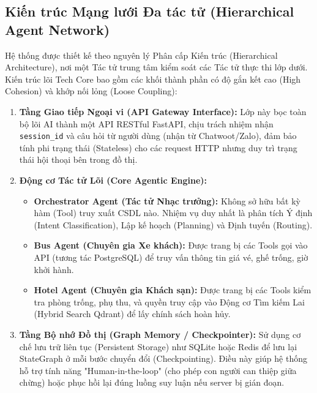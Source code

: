\subsection{Kiến trúc Mạng lưới Đa tác tử (Hierarchical Agent Network)}

Hệ thống được thiết kế theo nguyên lý Phân cấp Kiến trúc (Hierarchical Architecture), nơi một Tác tử trung tâm kiểm soát các Tác tử thực thi lớp dưới. Kiến trúc lõi Tech Core bao gồm các khối thành phần có độ gắn kết cao (High Cohesion) và khớp nối lỏng (Loose Coupling):

\begin{enumerate}
    \item \textbf{Tầng Giao tiếp Ngoại vi (API Gateway Interface):} Lớp này bọc toàn bộ lõi AI thành một API RESTful FastAPI, chịu trách nhiệm nhận \texttt{session\_id} và câu hỏi từ người dùng (nhận từ Chatwoot/Zalo), đảm bảo tính phi trạng thái (Stateless) cho các request HTTP nhưng duy trì trạng thái hội thoại bên trong đồ thị.
    \item \textbf{Động cơ Tác tử Lõi (Core Agentic Engine):}
    \begin{itemize}
        \item \textbf{Orchestrator Agent (Tác tử Nhạc trưởng):} Không sở hữu bất kỳ hàm (Tool) truy xuất CSDL nào. Nhiệm vụ duy nhất là phân tích Ý định (Intent Classification), Lập kế hoạch (Planning) và Định tuyến (Routing).
        \item \textbf{Bus Agent (Chuyên gia Xe khách):} Được trang bị các Tools gọi vào API (tương tác PostgreSQL) để truy vấn thông tin giá vé, ghế trống, giờ khởi hành.
        \item \textbf{Hotel Agent (Chuyên gia Khách sạn):} Được trang bị các Tools kiểm tra phòng trống, phụ thu, và quyền truy cập vào Động cơ Tìm kiếm Lai (Hybrid Search Qdrant) để lấy chính sách hoàn hủy.
    \end{itemize}
    \item \textbf{Tầng Bộ nhớ Đồ thị (Graph Memory / Checkpointer):} Sử dụng cơ chế lưu trữ liên tục (Persistent Storage) như SQLite hoặc Redis để lưu lại StateGraph ở mỗi bước chuyển đổi (Checkpointing). Điều này giúp hệ thống hỗ trợ tính năng "Human-in-the-loop" (cho phép con người can thiệp giữa chừng) hoặc phục hồi lại đúng luồng suy luận nếu server bị gián đoạn.
\end{enumerate}

